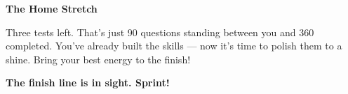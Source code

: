 {\vspace{3mm}

\begin{tcolorbox}[
    enhanced,
    colback=funGreenLight,
    colframe=funGreen!50,
    arc=10pt,
    boxrule=1pt,
    left=6mm, right=6mm, top=4mm, bottom=4mm,
]
{\bfseries\color{funGreenDark} \faFireAlt\hspace{2mm}The Home Stretch}

\vspace{2mm}

Three tests left. That's just 90 questions standing between you and 360 completed. You've already built the skills — now it's time to polish them to a shine. Bring your best energy to the finish!
\end{tcolorbox}

\vspace{4mm}

\begin{center}
{\large\bfseries\color{funBlueDark} \faRocket\hspace{2mm}The finish line is in sight. Sprint!\hspace{2mm}\faRocket}
\end{center}

}
\newpage
